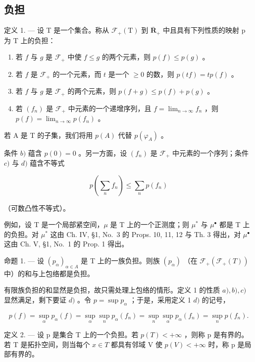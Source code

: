\subsection{负担}

定义 1. --- 设 T 是一个集合。称从 \(\mathcal{F}_{+}(\mathrm{T})\) 到 \(\overline{\mathbf{R}}_{+}\) 中且具有下列性质的映射 p 为 T 上的负担：

\begin{enumerate}
\def\labelenumi{\alph{enumi})}
\item
  若 \(f\) 与 \(g\) 是 \(\mathcal{F}_+\) 中使 \(f \leqslant g\) 的两个元素，则 \(p(f) \leqslant p(g)\) 。
\item
  若 \(f\) 是 \(\mathcal{F}_+\) 的一个元素，而 \(t\) 是一个 \(\geqslant 0\) 的数，则 \(p(tf) = tp(f)\) 。
\item
  若 \(f\) 与 \(g\) 是 \(\mathcal{F}_+\) 的两个元素，则 \(p(f + g) \leqslant p(f) + p(g)\) 。
\item
  若 \((f_n)\) 是 \(\mathcal{F}_+\) 中元素的一个递增序列，且 \(f = \lim_{n \to \infty} f_n\) ，则 \(p(f) = \lim_{n \to \infty} p(f_n)\) 。
\end{enumerate}

若 A 是 T 的子集，我们将用 \(p(A)\) 代替 \(p(\varphi_A)\) 。

条件 \(b)\) 蕴含 \(p(0) = 0\) 。另一方面，设 \((f_n)\) 是 \(\mathcal{F}_+\) 中元素的一个序列；条件 \(c)\) 与 \(d)\) 蕴含不等式

\[
p \left(\sum_ {n} f _ {n}\right) \leqslant \sum_ {n} p (f _ {n})
\]

（可数凸性不等式）。

例如，设 T 是一个局部紧空间，\(\mu\) 是 T 上的一个正测度；则 \(\mu^{*}\) 与 \(\mu^{\bullet}\) 都是 T 上的负担。对 \(\mu^{*}\) 这由 Ch. IV, §1, No.~3 的 Props. 10, 11, 12 与 Th. 3 得出，对 \(\mu^{\bullet}\) 这由 Ch. V, §1, No.~1 的 Prop. 1 得出。

命题 1. --- 设 \((p_{\alpha})_{\alpha \in A}\) 是 T 上的一族负担。则族 \((p_{\alpha})\) （在 \(\mathcal{F}_{+}(\mathcal{F}_{+}(T))\) 中）的和与上包络都是负担。

有限族负担的和显然是负担，故只需处理上包络的情形。定义 1 的性质 \(a), b), c)\) 显然满足，剩下要证 \(d)\) 。令 \(p = \sup p_{\alpha}\) ；于是，采用定义 1 \(d)\) 的记号，

\[
p (f) = \sup _ {\alpha} p _ {\alpha} (f) = \sup _ {\alpha} \sup _ {n} p _ {\alpha} (f _ {n}) = \sup _ {n} \sup _ {\alpha} p _ {\alpha} (f _ {n}) = \sup _ {n} p (f _ {n}).
\]

定义 2. --- 设 p 是集合 T 上的一个负担。若 \(p(T) < +\infty\) ，则称 p 是有界的。若 T 是拓扑空间，则当每个 \(x \in T\) 都具有邻域 V 使 \(p(V) < +\infty\) 时，称 p 是局部有界的。

